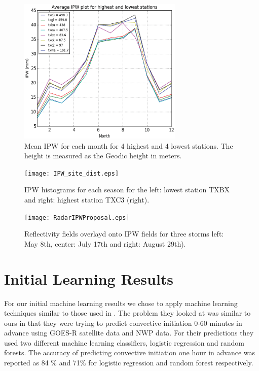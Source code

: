 \documentclass[proposal]{umassthesis}
\begin{document}
\begin{figure}[!t]
\begin{center}
\includegraphics[width = 0.7\textwidth]{Highest_Lowest_Sites.eps}
\caption{Mean IPW for each month for 4 highest and 4 lowest stations. The height is measured as the Geodic height in meters.}
\label{fig:Highest_Lowest_Site}
\end{center}
\end{figure}

\begin{figure}[!t]
\begin{center}
\texttt{[image: IPW\_site\_dist.eps]}
\caption{IPW histograms for each season for the left: lowest station TXBX and right: highest station TXC3 (right).}
\label{fig:IPW_site_dist}
\end{center}
\end{figure}

\begin{figure}[!h]
\begin{center}
\texttt{[image: RadarIPWProposal.eps]}
\caption{Reflectivity fields overlayd onto IPW fields for three storms left: May 8th, center: July 17th and right: August 29th).}\label{fig:ipw_radar}
\end{center}
\end{figure}
\chapter{Initial Learning Results}
For our initial machine learning results we chose to apply machine learning techniques similar to those used in \cite{mecikalski2015probabilistic}. The problem they looked at was similar to ours in that they were trying to predict convective initiation 0-60 minutes in advance using GOES-R satellite data and NWP data. For their predictions they used two different machine learning classifiers, logistic regression and random forests. The accuracy of predicting convective initiation one hour in advance was reported as 84 \% and 71\% for logistic regression and random forest respectively.
\end{document}
